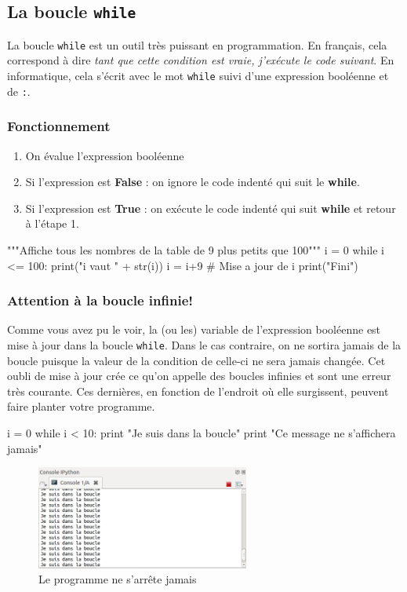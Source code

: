 \subsection{La boucle \texttt{while}}

La boucle \texttt{while} est un outil très puissant en programmation. En français, cela correspond à dire \textit{tant que cette condition est vraie, j'exécute le code suivant}. En informatique, cela s'écrit avec le mot \texttt{while} suivi d'une expression booléenne et de \texttt{:}.
\subsubsection{Fonctionnement}
\begin{enumerate}
\item On évalue l'expression booléenne
\item Si l'expression est \textbf{False} : on ignore le code indenté qui suit le \textbf{while}.
\item Si l'expression est \textbf{True} : on exécute le code indenté qui suit \textbf{while} et retour à l'étape 1.
\end{enumerate} 
\begin{python}[caption = Exemple de boucle while]
"""Affiche tous les nombres de la table de 9 plus petits que 100"""
i = 0
while i <= 100:
	print("i vaut " + str(i))
	i = i+9	# Mise a jour de i
print("Fini")
\end{python}

\subsubsection{Attention à la boucle infinie!}

Comme vous avez pu le voir, la (ou les) variable de l'expression booléenne est mise à jour dans la boucle \texttt{while}. Dans le cas contraire, on ne sortira jamais de la boucle puisque la valeur de la condition de celle-ci ne sera jamais changée. Cet oubli de mise à jour crée ce qu'on appelle des boucles infinies et sont une erreur très courante. Ces dernières, en fonction de l'endroit où elle surgissent, peuvent faire planter votre programme.

\begin{python}[caption = Exemple de boucle infinie]
i = 0
while i < 10:
	print "Je suis dans la boucle"
print "Ce message ne s'affichera jamais"
\end{python}

\begin{figure}[!h]
    \centering
    \includegraphics[width=7cm]{boucle_inf.png}
    \caption{Le programme ne s'arrête jamais}
    \label{arbre}
\end{figure}

